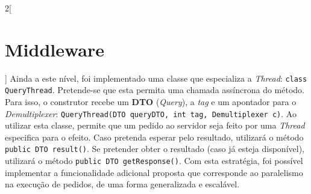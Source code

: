 \documentclass[a4paper,11pt]{article}
\begin{document}
\begin{multicols}{2}[\section{Middleware}]
    Ainda a este nível, foi implementado uma classe que especializa a \textit{Thread}:
    \texttt{class QueryThread}.
    Pretende-se que esta permita uma chamada assíncrona do método.
    Para isso, o construtor recebe um \textbf{DTO} (\textit{Query}), a \textit{tag}
    e um apontador para o \textit{Demultiplexer}: 
    \texttt{QueryThread(DTO queryDTO, int tag, Demultiplexer c)}.
    Ao utilizar esta classe, permite que um pedido ao servidor seja feito
    por uma \textit{Thread} especifica para o efeito.
    Caso pretenda esperar pelo resultado, utilizará o método \texttt{public DTO result()}.
    Se pretender obter o resultado (caso já esteja disponível), utilizará o método
    \texttt{public DTO getResponse()}.
    Com esta estratégia, foi possível implementar a funcionalidade adicional proposta
    que corresponde ao paralelismo na execução de pedidos, de uma forma generalizada e escalável.    
    
\end{multicols}
\end{document}
